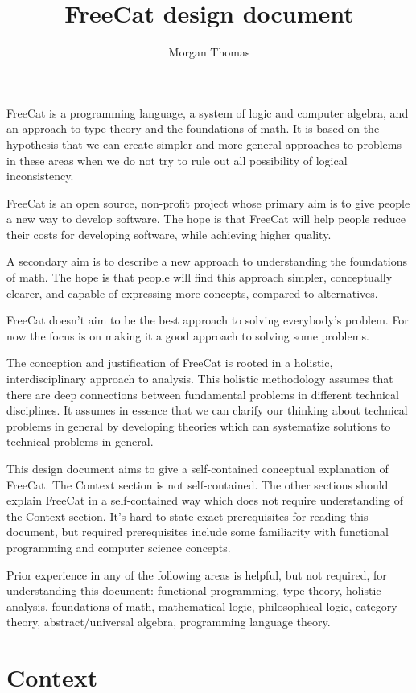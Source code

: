 \documentclass{article}
\title{FreeCat design document}
\author{Morgan Thomas}
\begin{document}
\maketitle

FreeCat is a programming language, a system of logic and computer algebra, and an approach to type theory and the foundations of math. It is based on the hypothesis that we can create simpler and more general approaches to problems in these areas when we do not try to rule out all possibility of logical inconsistency.

FreeCat is an open source, non-profit project whose primary aim is to give people a new way to develop software. The hope is that FreeCat will help people reduce their costs for developing software, while achieving higher quality.

A secondary aim is to describe a new approach to understanding the foundations of math. The hope is that people will find this approach simpler, conceptually clearer, and capable of expressing more concepts, compared to alternatives.

FreeCat doesn't aim to be the best approach to solving everybody's problem. For now the focus is on making it a good approach to solving some problems.

The conception and justification of FreeCat is rooted in a holistic, interdisciplinary approach to analysis. This holistic methodology assumes that there are deep connections between fundamental problems in different technical disciplines. It assumes in essence that we can clarify our thinking about technical problems in general by developing theories which can systematize solutions to technical problems in general.

This design document aims to give a self-contained conceptual explanation of FreeCat. The Context section is not self-contained. The other sections should explain FreeCat in a self-contained way which does not require understanding of the Context section. It's hard to state exact prerequisites for reading this document, but required prerequisites include some familiarity with functional programming and computer science concepts.

Prior experience in any of the following areas is helpful, but not required, for understanding this document: functional programming, type theory, holistic analysis, foundations of math, mathematical logic, philosophical logic, category theory, abstract/universal algebra, programming language theory.

\section{Context}
\end{document}
